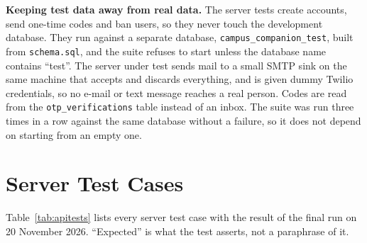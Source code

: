\medskip
\noindent\textbf{Keeping test data away from real data.} The server tests create accounts,
send one-time codes and ban users, so they never touch the development database. They run
against a separate database, \texttt{campus\_companion\_test}, built from
\texttt{schema.sql}, and the suite refuses to start unless the database name contains
``test''. The server under test sends mail to a small SMTP sink on the same machine that
accepts and discards everything, and is given dummy Twilio credentials, so no e-mail or text
message reaches a real person. Codes are read from the \texttt{otp\_verifications} table
instead of an inbox. The suite was run three times in a row against the same database
without a failure, so it does not depend on starting from an empty one.

\section{Server Test Cases}

Table~\ref{tab:apitests} lists every server test case with the result of the final run on
20 November 2026. ``Expected'' is what the test asserts, not a paraphrase of it.

